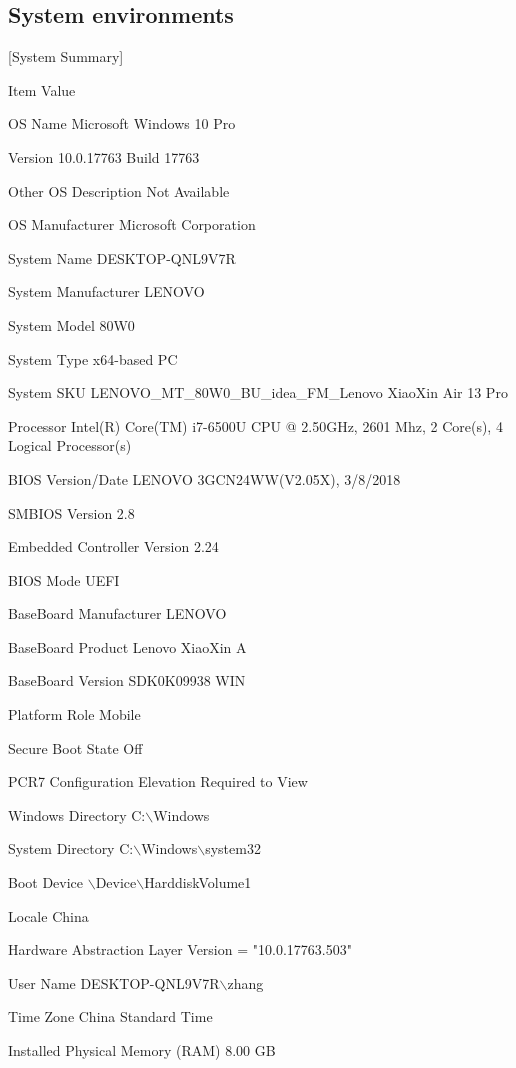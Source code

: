 \documentclass[a4paper]{report}
\begin{document}
\subsection{System environments}
[System Summary]
\par
Item	Value	
\par
OS Name	Microsoft Windows 10 Pro	
\par
Version	10.0.17763 Build 17763	
\par
Other OS Description 	Not Available	
\par
OS Manufacturer	Microsoft Corporation	
\par
System Name	DESKTOP-QNL9V7R	
\par
System Manufacturer	LENOVO	
\par
System Model	80W0	
\par
System Type	x64-based PC	
\par
System SKU	LENOVO\_MT\_80W0\_BU\_idea\_FM\_Lenovo XiaoXin Air 13 Pro	
\par
Processor	Intel(R) Core(TM) i7-6500U CPU @ 2.50GHz, 2601 Mhz, 2 Core(s), 4 Logical Processor(s)	
\par
BIOS Version/Date	LENOVO 3GCN24WW(V2.05X), 3/8/2018	
\par
SMBIOS Version	2.8	
\par
Embedded Controller Version	2.24	
\par
BIOS Mode	UEFI	
\par
BaseBoard Manufacturer	LENOVO	
\par
BaseBoard Product	Lenovo XiaoXin A	
\par
BaseBoard Version	SDK0K09938 WIN	
\par
Platform Role	Mobile	
\par
Secure Boot State	Off	
\par
PCR7 Configuration	Elevation Required to View	
\par
Windows Directory	C:$\backslash$Windows	
\par
System Directory	C:$\backslash$Windows$\backslash$system32	
\par
Boot Device	$\backslash$Device$\backslash$HarddiskVolume1	
\par
Locale	 China	
\par 
Hardware Abstraction Layer	Version = "10.0.17763.503"	
\par
User Name	DESKTOP-QNL9V7R$\backslash$zhang	
\par
Time Zone	China Standard Time	
\par
Installed Physical Memory (RAM)	8.00 GB	
\end{document}
